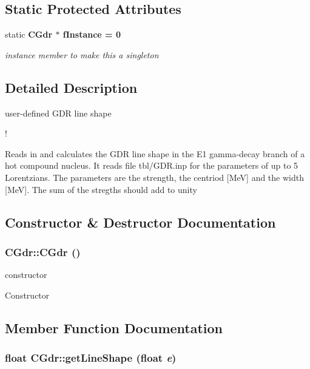\subsection*{Static Protected Attributes}
\begin{CompactItemize}
\item 
static \bf{CGdr} $\ast$ \bf{f\-Instance} = 0\label{classCGdr_110074ff5463736410db73cf879a1da7}

\begin{CompactList}\small\item\em instance member to make this a singleton \item\end{CompactList}\end{CompactItemize}


\subsection{Detailed Description}
user-defined GDR line shape 

!

Reads in and calculates the GDR line shape in the E1 gamma-decay branch of a hot compound nucleus. It reads file tbl/GDR.inp for the parameters of up to 5 Lorentzians. The parameters are the strength, the centriod [Me\-V] and the width [Me\-V]. The sum of the stregths should add to unity 



\subsection{Constructor \& Destructor Documentation}
\subsubsection{\setlength{\rightskip}{0pt plus 5cm}CGdr::CGdr ()\hspace{0.3cm}{\tt  [protected]}}\label{classCGdr_52f73d6ce2df98d16f9a967daf751e85}


constructor 

Constructor 

\subsection{Member Function Documentation}
\subsubsection{\setlength{\rightskip}{0pt plus 5cm}float CGdr::get\-Line\-Shape (float {\em e})}\label{classCGdr_a29daeb20eee74d9d7026d93d44bf152}



